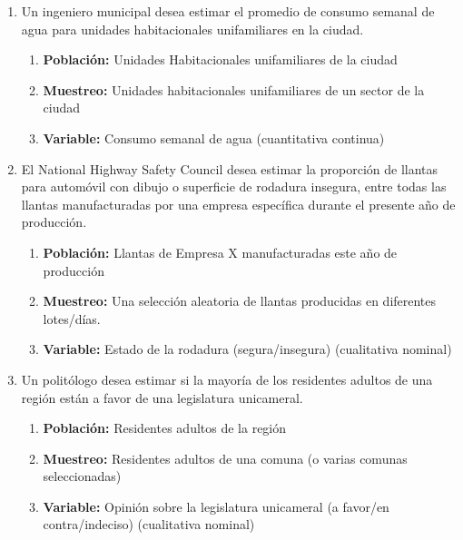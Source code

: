 \documentclass[12pt, letterpaper]{article}
\begin{document}
\begin{enumerate}
    \item Un ingeniero municipal desea estimar el promedio de consumo semanal de agua para unidades habitacionales unifamiliares en la ciudad.
        \begin{enumerate}
            \item \textbf{Población:} Unidades Habitacionales unifamiliares de la ciudad %
            \item \textbf{Muestreo:} Unidades habitacionales unifamiliares de un sector de la ciudad %
            \item \textbf{Variable:} Consumo semanal de agua (cuantitativa continua) %
        \end{enumerate}
    \item El National Highway Safety Council desea estimar la proporción de llantas para automóvil con dibujo o superficie de rodadura insegura, entre todas las llantas manufacturadas por una empresa específica durante el presente año de producción.
        \begin{enumerate}
            \item \textbf{Población:} Llantas de Empresa X manufacturadas este año de producción %
            \item \textbf{Muestreo:} Una selección aleatoria de llantas producidas en diferentes lotes/días. %
            \item \textbf{Variable:} Estado de la rodadura (segura/insegura) (cualitativa nominal) %
        \end{enumerate}

    \item Un politólogo desea estimar si la mayoría de los residentes adultos de una región están a favor de una legislatura unicameral.
        \begin{enumerate}
            \item \textbf{Población:} Residentes adultos de la región
            \item \textbf{Muestreo:} Residentes adultos de una comuna (o varias comunas seleccionadas)
            \item \textbf{Variable:} Opinión sobre la legislatura unicameral (a favor/en contra/indeciso) (cualitativa nominal)  %
        \end{enumerate}


\end{enumerate}
\end{document}
